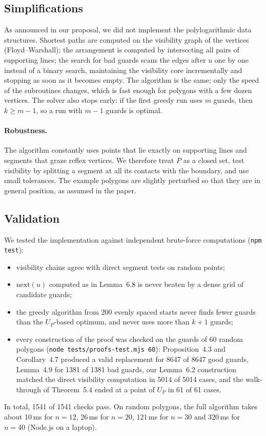 \documentclass[11pt,a4paper]{article}
\theoremstyle{definition}
\theoremstyle{remark}
\newcommand{\nextop}{\mathrm{next}}
\begin{document}
\subsection{Simplifications}

As announced in our proposal, we did not implement the polylogarithmic data structures. Shortest paths are computed on the visibility graph of the vertices
(Floyd--Warshall); the arrangement is computed by intersecting all pairs of supporting lines; the search for bad guards scans the edges after $u$ one by one
instead of a binary search, maintaining the visibility core incrementally and stopping as soon as it becomes empty. The algorithm is the same; only the speed
of the subroutines changes, which is fast enough for polygons with a few dozen vertices. The solver also stops early: if the first greedy run uses $m$ guards,
then $k\ge m-1$, so a run with $m-1$ guards is optimal.

\paragraph{Robustness.} The algorithm constantly uses points that lie exactly on supporting lines and segments that graze reflex vertices. We therefore treat
$P$ as a closed set, test visibility by splitting a segment at all its contacts with the boundary, and use small tolerances. The example polygons are slightly
perturbed so that they are in general position, as assumed in the paper.

\subsection{Validation}

We tested the implementation against independent brute-force computations (\texttt{npm test}):
\begin{itemize}
\item visibility chains agree with direct segment tests on random points;
\item $\nextop(u)$ computed as in Lemma~6.8 is never beaten by a dense grid of candidate guards;
\item the greedy algorithm from 200 evenly spaced starts never finds fewer guards than the $U_P$-based optimum, and never uses more than $k+1$ guards;
\item every construction of the proof was checked on the guards of 60 random polygons (\texttt{node tests/proofs-test.mjs 60}): Proposition~4.3 and Corollary~4.7 produced a valid replacement for
8647 of 8647 good guards, Lemma~4.9 for 1381 of 1381 bad guards, our Lemma~6.2 construction matched the direct visibility computation in 5014 of 5014 cases,
and the walk-through of Theorem~5.4 ended at a point of $U_P$ in 61 of 61 cases.
\end{itemize}
In total, 1541 of 1541 checks pass. On random polygons, the full algorithm takes about 10\,ms for $n=12$, 26\,ms for $n=20$, 121\,ms for $n=30$
and 320\,ms for $n=40$ (Node.js on a laptop).
\end{document}
